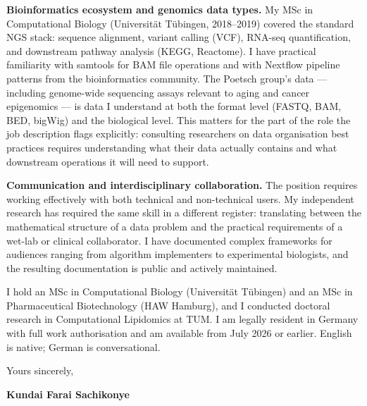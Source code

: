 \documentclass[12pt,a4paper]{article}
\begin{document}
\textbf{Bioinformatics ecosystem and genomics data types.}
My MSc in Computational Biology (Universität Tübingen, 2018--2019) covered
the standard NGS stack: sequence alignment, variant calling (VCF), RNA-seq
quantification, and downstream pathway analysis (KEGG, Reactome).
I have practical familiarity with samtools for BAM file operations and with
Nextflow pipeline patterns from the bioinformatics community.
The Poetsch group's data --- including genome-wide sequencing assays relevant
to aging and cancer epigenomics --- is data I understand at both the format
level (FASTQ, BAM, BED, bigWig) and the biological level.
This matters for the part of the role the job description flags explicitly:
consulting researchers on data organisation best practices requires understanding
what their data actually contains and what downstream operations it will need to
support.

\textbf{Communication and interdisciplinary collaboration.}
The position requires working effectively with both technical and non-technical
users. My independent research has required the same skill in a different
register: translating between the mathematical structure of a data problem and
the practical requirements of a wet-lab or clinical collaborator.
I have documented complex frameworks for audiences ranging from algorithm
implementers to experimental biologists, and the resulting documentation is
public and actively maintained.

I hold an MSc in Computational Biology (Universität Tübingen) and an MSc in
Pharmaceutical Biotechnology (HAW Hamburg), and I conducted doctoral research
in Computational Lipidomics at TUM.
I am legally resident in Germany with full work authorisation and am available
from July 2026 or earlier. English is native; German is conversational.

\vspace{1.5em}
Yours sincerely,

\vspace{2.5em}
\textbf{Kundai Farai Sachikonye}
\end{document}
